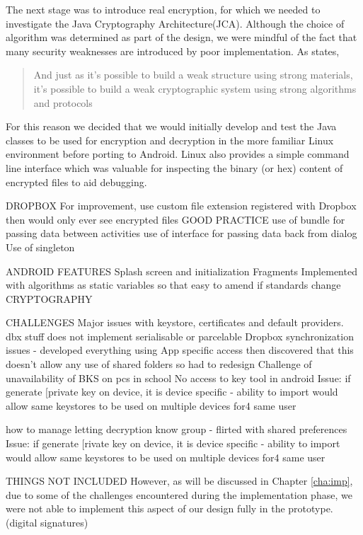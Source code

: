 The next stage was to introduce real encryption, for which we needed to investigate the Java Cryptography Architecture(JCA).  Although the choice of algorithm was determined as part of the design, we were mindful of the fact that  many security weaknesses are introduced by poor implementation. As \citet{schneier1998security} states,
\begin{quotation}
And just as it's possible to build a weak structure using strong materials, it's possible to build a weak cryptographic system using strong algorithms and protocols 
\end{quotation}  
For this reason we decided that we would initially develop and test the  Java classes to be used for encryption and decryption in the more familiar Linux environment before porting to Android.  Linux also provides a simple command line interface which was valuable for inspecting the binary (or hex) content of encrypted files to aid debugging.





DROPBOX
For improvement, use custom file extension registered with Dropbox then would only ever see encrypted files
GOOD PRACTICE
use of bundle for passing data between activities
use of interface for passing data back from dialog
Use of singleton



ANDROID FEATURES
Splash screen and initialization
Fragments
Implemented with algorithms as static variables so that easy to amend if standards change
CRYPTOGRAPHY



CHALLENGES
Major issues with keystore, certificates and default providers.
dbx stuff does not implement serialisable or parcelable
Dropbox synchronization issues - developed everything using App specific access then discovered that this doesn't allow any use of shared folders so had to redesign 
Challenge of unavailability of BKS on pcs in school
No access to key tool in android
Issue: if generate [private key on device, it is device specific - ability to import would allow same keystores to be used on multiple devices for4 same user

how to manage letting decryption know group - flirted with shared preferences
Issue: if generate [rivate key on device, it is device specific - ability to import would allow same keystores to be used on multiple devices for4 same user

THINGS NOT INCLUDED
However, as will be discussed in Chapter \ref{cha:imp}, due to some of the challenges encountered during the implementation phase, we were not able to implement this aspect of our design fully in the prototype. (digital signatures)

